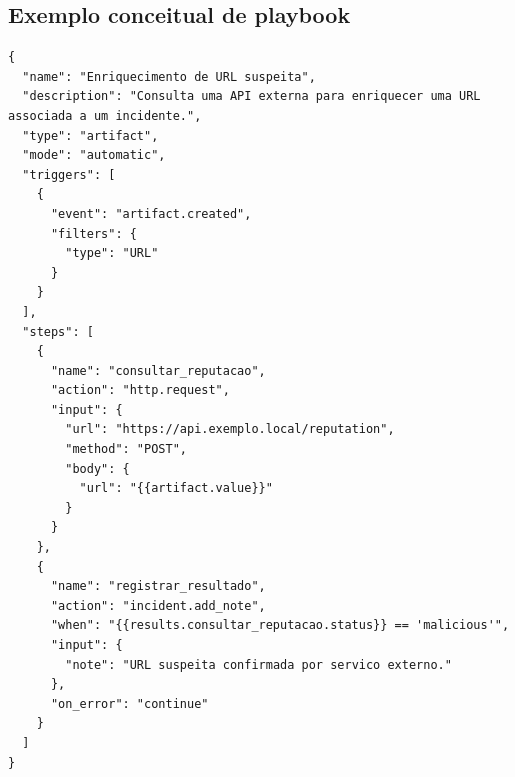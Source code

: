 \documentclass[article,a4paper,12pt,english,brazil,sumario=tradicional]{abntex2}
\begin{document}
\newpage
\renewcommand{\bibname}{Referências}


\begin{appendices}

\newpage
\chapter{Exemplo conceitual de playbook}
\vspace{-35pt}

\begin{lstlisting}[basicstyle=\ttfamily\tiny]
{
  "name": "Enriquecimento de URL suspeita",
  "description": "Consulta uma API externa para enriquecer uma URL associada a um incidente.",
  "type": "artifact",
  "mode": "automatic",
  "triggers": [
    {
      "event": "artifact.created",
      "filters": {
        "type": "URL"
      }
    }
  ],
  "steps": [
    {
      "name": "consultar_reputacao",
      "action": "http.request",
      "input": {
        "url": "https://api.exemplo.local/reputation",
        "method": "POST",
        "body": {
          "url": "{{artifact.value}}"
        }
      }
    },
    {
      "name": "registrar_resultado",
      "action": "incident.add_note",
      "when": "{{results.consultar_reputacao.status}} == 'malicious'",
      "input": {
        "note": "URL suspeita confirmada por servico externo."
      },
      "on_error": "continue"
    }
  ]
}
\end{lstlisting}

\end{appendices}
\end{document}
